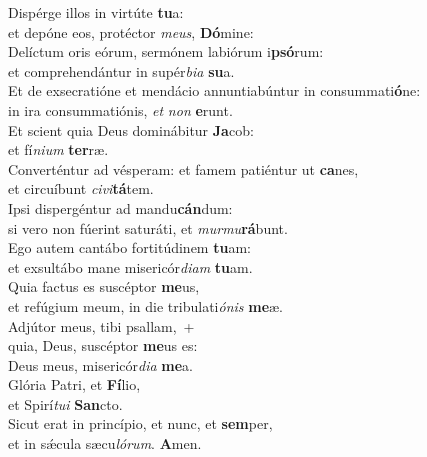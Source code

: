 \evenverse Dispérge illos in virtúte \textbf{tu}a:~\*\\
\evenverse et depóne eos, protéctor \textit{me}\textit{us}, \textbf{Dó}mine:\\
\oddverse Delíctum oris eórum, sermónem labiórum i\textbf{psó}rum:~\*\\
\oddverse et comprehendántur in supér\textit{bi}\textit{a} \textbf{su}a.\\
\evenverse Et de exsecratióne et mendácio annuntiabúntur in consummati\textbf{ó}ne:~\*\\
\evenverse in ira consummatiónis, \textit{et} \textit{non} \textbf{e}runt.\\
\oddverse Et scient quia Deus dominábitur \textbf{Ja}cob:~\*\\
\oddverse et fí\textit{ni}\textit{um} \textbf{ter}ræ.\\
\evenverse Converténtur ad vésperam: et famem patiéntur ut \textbf{ca}nes,~\*\\
\evenverse et circuíbunt \textit{ci}\textit{vi}\textbf{tá}tem.\\
\oddverse Ipsi dispergéntur ad mandu\textbf{cán}dum:~\*\\
\oddverse si vero non fúerint saturáti, et \textit{mur}\textit{mu}\textbf{rá}bunt.\\
\evenverse Ego autem cantábo fortitúdinem \textbf{tu}am:~\*\\
\evenverse et exsultábo mane misericór\textit{di}\textit{am} \textbf{tu}am.\\
\oddverse Quia factus es suscéptor \textbf{me}us,~\*\\
\oddverse et refúgium meum, in die tribulati\textit{ó}\textit{nis} \textbf{me}æ.\\
\evenverse Adjútor meus, tibi psallam,~+\\
\evenverse  quia, Deus, suscéptor \textbf{me}us es:~\*\\
\evenverse Deus meus, misericór\textit{di}\textit{a} \textbf{me}a.\\
\oddverse Glória Patri, et \textbf{Fí}lio,~\*\\
\oddverse et Spirí\textit{tu}\textit{i} \textbf{San}cto.\\
\evenverse Sicut erat in princípio, et nunc, et \textbf{sem}per,~\*\\
\evenverse et in sǽcula sæcu\textit{ló}\textit{rum}. \textbf{A}men.\\
